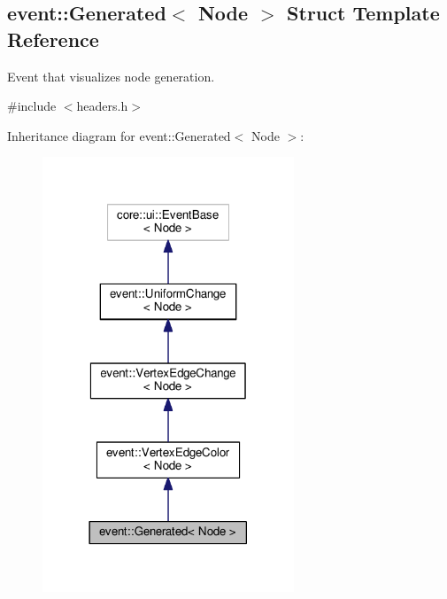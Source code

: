 \hypertarget{structevent_1_1Generated}{}\subsection{event\+:\+:Generated$<$ Node $>$ Struct Template Reference}
\label{structevent_1_1Generated}


Event that visualizes node generation.  




{\ttfamily \#include $<$headers.\+h$>$}



Inheritance diagram for event\+:\+:Generated$<$ Node $>$\+:\nopagebreak
\begin{figure}[H]
\begin{center}
\leavevmode
\includegraphics[width=213pt]{structevent_1_1Generated__inherit__graph}
\end{center}
\end{figure}


